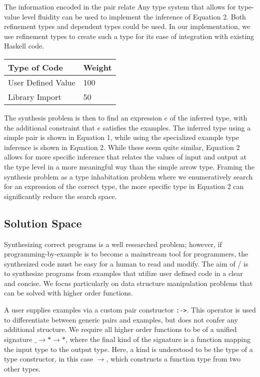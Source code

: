 The information encoded in the pair relate
Any type system that allows for type-value level fluidity can be used to implement the inference of Equation 2.
Both refinement types and dependent types could be used. 
In our implementation, we use refinement types to create such a type for its ease of integration with existing Haskell code.

\begin{table}
    \begin{tabular}{l|l}
        \hline
        Type of Code & Weight \\ \hline
        User Defined Value & 100 \\ 
        Library Import &  50\\
    \end{tabular}
\end{table}

The synthesis problem is then to find an expression $e$ of the inferred type, with the additional constraint that $e$ satisfies the examples.
The inferred type using a simple pair is shown in Equation 1, while using the specialized example type inference is shown in Equation 2.
While these seem quite similar, Equation 2 allows for more specific inference that relates the values of input and output at the type level in a more meaningful way than the simple arrow type.
Framing the synthesis problem as a type inhabitation problem where we enumeratively search for an expression of the correct type\cite{DBLP:conf/pldi/GveroKKP13}, the more specific type in Equation 2 can significantly reduce the search space.



%

\subsection{Solution Space}\label{solnSpace}
Synthesizing correct programs is a well researched problem; however, if programming-by-example is to become a mainstream tool for programmers, the synthesized code must be easy for a human to read and modify.
The aim of \ourTool/ is to synthesize programs from examples that utilize user defined code in a clear and concise.
We focus particularly on data structure manipulation problems that can be solved with higher order functions.


A user supplies examples via a custom pair constructor \texttt{:->}. This operator is used to differentiate between generic pairs and examples, but does not confer any additional structure. We require all higher order functions to be of a unified signature \texttt{$\_ \to * \to *$}, where the final kind of the signature is a function mapping the input type to the output type. Here, a kind is understood to be the type of a type constructor, in this case \texttt{$\to$}, which constructs a function type from two other types.

